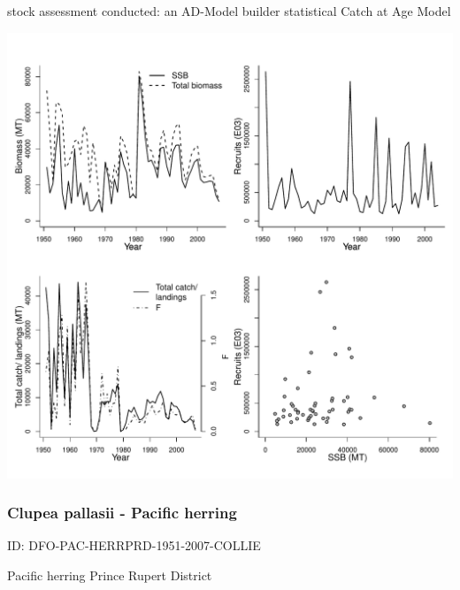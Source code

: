 stock assessment conducted: an AD-Model builder statistical Catch at Age Model 
\begin{center}
\vspace{-0.2cm}\includegraphics[scale=0.65]{../tex/figures/plot-DFO-PAC-HERRCC-1951-2007-COLLIE.pdf}
\end{center}

\newpage
\subsubsection{Clupea pallasii - Pacific herring}
ID: DFO-PAC-HERRPRD-1951-2007-COLLIE

Pacific herring Prince Rupert District 


